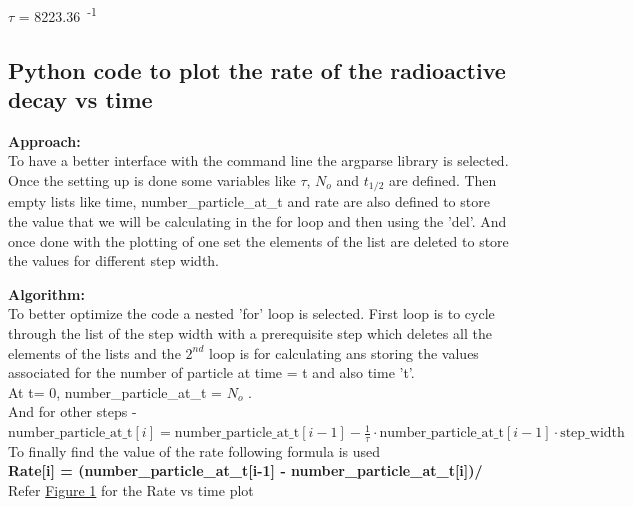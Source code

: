 \documentclass[11pt]{article}
\begin{document}
$\tau$ = 8223.36\, \textsuperscript{-1}

\begin{figure}[h]

\end{figure}

\subsection{Python code to plot the rate of the radioactive decay vs time}
\begin{raggedright}
\begin{justify}
\textbf{Approach:}\\
To have a better interface with the command line the argparse library is selected. Once the setting up is done some variables like $\tau$, $N_{o}$ and $t_{1/2}$ are defined. Then empty lists like time, number\_particle\_at\_t and rate are also defined to store the value that we will be calculating in the for loop and then using the 'del'. And once done with the plotting of one set the elements of the list are deleted to store the values for different step width.
\end{justify}
\end{raggedright}

\begin{raggedright}
\begin{justify}
\textbf{Algorithm:}\\
To better optimize the code a nested 'for' loop is selected. First loop is to cycle through the list of the step width with a prerequisite step which deletes all the elements of the lists and the $2^{nd}$ loop is for calculating ans storing the values associated for the number of particle at time = t and also time 't'.\\
At t= 0, number\_particle\_at\_t = $N_{o}$ .\\
And for other steps - \\
\textbf{\( \text{number\_particle\_at\_t}[i]=\text{number\_particle\_at\_t}[i-1] - \frac{1}{\tau} \cdot \text{number\_particle\_at\_t}[i-1] \cdot \text{step\_width}\)} \\
To finally find the value of the rate following formula is used\\
\textbf{Rate[i] = (number\_particle\_at\_t[i-1] - number\_particle\_at\_t[i])/}\\
Refer \hyperref[fig:Rate of radioactive decay for step width = 10, 100]{Figure 1} for the Rate vs time plot
\end{justify}
\end{raggedright}
\end{document}
